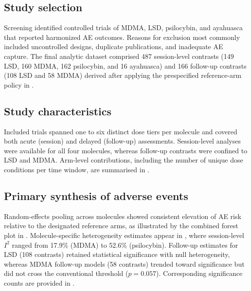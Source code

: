 \subsection{Study selection}
Screening identified controlled trials of MDMA, LSD, psilocybin, and ayahuasca that reported harmonized AE outcomes. Reasons for exclusion most commonly included uncontrolled designs, duplicate publications, and inadequate AE capture. The final analytic dataset comprised 487 session-level contrasts (149 LSD, 160 MDMA, 162 psilocybin, and 16 ayahuasca) and 166 follow-up contrasts (108 LSD and 58 MDMA) derived after applying the prespecified reference-arm policy in .

\subsection{Study characteristics}
Included trials spanned one to six distinct dose tiers per molecule and covered both acute (session) and delayed (follow-up) assessments. Session-level analyses were available for all four molecules, whereas follow-up contrasts were confined to LSD and MDMA. Arm-level contributions, including the number of unique dose conditions per time window, are summarised in .

\subsection{Primary synthesis of adverse events}
Random-effects pooling across molecules showed consistent elevation of AE risk relative to the designated reference arms, as illustrated by the combined forest plot in . Molecule-specific heterogeneity estimates appear in , where session-level $I^2$ ranged from 17.9\% (MDMA) to 52.6\% (psilocybin). Follow-up estimates for LSD (108 contrasts) retained statistical significance with null heterogeneity, whereas MDMA follow-up models (58 contrasts) trended toward significance but did not cross the conventional threshold ($p=0.057$). Corresponding significance counts are provided in .

